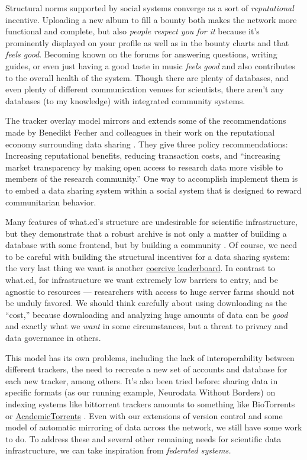 \documentclass[10pt]{tufte-book}
\begin{document}
Structural norms supported by social systems converge as a sort of
\emph{reputational} incentive. Uploading a new album to fill a bounty
both makes the network more functional and complete, but also
\emph{people respect you for it} because it's prominently displayed on
your profile as well as in the bounty charts and that \emph{feels good}.
Becoming known on the forums for answering questions, writing guides, or
even just having a good taste in music \emph{feels good} and also
contributes to the overall health of the system. Though there are plenty
of databases, and even plenty of different communication venues for
scientists, there aren't any databases (to my knowledge) with integrated
community systems.

The tracker overlay model mirrors and extends some of the
recommendations made by Benedikt Fecher and colleagues in their work on
the reputational economy surrounding data sharing \citep{fecherReputationEconomyHow2017} . They give three policy
recommendations: Increasing reputational benefits, reducing transaction
costs, and ``increasing market transparency by making open access to
research data more visible to members of the research community.'' One
way to accomplish implement them is to embed a data sharing system
within a social system that is designed to reward communitarian
behavior.

Many features of what.cd's structure are undesirable for scientific
infrastructure, but they demonstrate that a robust archive is not only a
matter of building a database with some frontend, but by building a
community \citep{brossCommunityCollaborationContribution2013} . Of
course, we need to be careful with building the structural incentives
for a data sharing system: the very last thing we want is another
\href{https://etiennelebel.com/cs/t-leaderboard/t-leaderboard.html}{coercive
leaderboard}. In contrast to what.cd, for infrastructure we want
extremely low barriers to entry, and be agnostic to resources ---
researchers with access to huge server farms should not be unduly
favored. We should think carefully about using downloading as the
``cost,'' because downloading and analyzing huge amounts of data can be
\emph{good} and exactly what we \emph{want} in some circumstances, but a
threat to privacy and data governance in others.

This model has its own problems, including the lack of interoperability
between different trackers, the need to recreate a new set of accounts
and database for each new tracker, among others. It's also been tried
before: sharing data in specific formats (as our running example,
Neurodata Without Borders) on indexing systems like bittorrent trackers
amounts to something like BioTorrents \citep{langilleBioTorrentsFileSharing2010}  or
\href{https://academictorrents.com/}{AcademicTorrents} \citep{cohenAcademicTorrentsCommunityMaintained2014} . Even with our
extensions of version control and some model of automatic mirroring of
data across the network, we still have some work to do. To address these
and several other remaining needs for scientific data infrastructure, we
can take inspiration from \emph{federated systems.}
\end{document}
